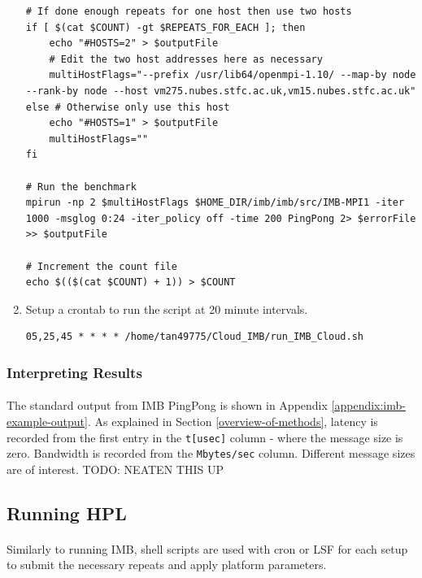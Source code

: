 \documentclass{article}
\newenvironment{code}{\captionsetup{type=listing}}{}
\begin{document}
\begin{enumerate}
\begin{code}
\begin{verbatim}
# If done enough repeats for one host then use two hosts
if [ $(cat $COUNT) -gt $REPEATS_FOR_EACH ]; then
    echo "#HOSTS=2" > $outputFile
    # Edit the two host addresses here as necessary
    multiHostFlags="--prefix /usr/lib64/openmpi-1.10/ --map-by node  --rank-by node --host vm275.nubes.stfc.ac.uk,vm15.nubes.stfc.ac.uk"
else # Otherwise only use this host
    echo "#HOSTS=1" > $outputFile
    multiHostFlags=""
fi

# Run the benchmark
mpirun -np 2 $multiHostFlags $HOME_DIR/imb/imb/src/IMB-MPI1 -iter 1000 -msglog 0:24 -iter_policy off -time 200 PingPong 2> $errorFile >> $outputFile

# Increment the count file
echo $(($(cat $COUNT) + 1)) > $COUNT
                    \end{verbatim}
                    \end{code}
                \item Setup a crontab to run the script at 20 minute intervals.

                    \begin{verbatim}
05,25,45 * * * * /home/tan49775/Cloud_IMB/run_IMB_Cloud.sh
                    \end{verbatim}
            \end{enumerate}

        \subsubsection{Interpreting Results}
            \paragraph{}
            The standard output from IMB PingPong is shown in Appendix \ref{appendix:imb-example-output}. As explained in Section \ref{overview-of-methods}, latency is recorded from the first entry in the \verb|t[usec]| column - where the message size is zero. Bandwidth is recorded from the \verb|Mbytes/sec| column. Different message sizes are of interest.
            TODO: NEATEN THIS UP





    \subsection{Running HPL}
        \paragraph{}
        Similarly to running IMB, shell scripts are used with cron or LSF for each setup to submit the necessary repeats and apply platform parameters.
\end{document}
